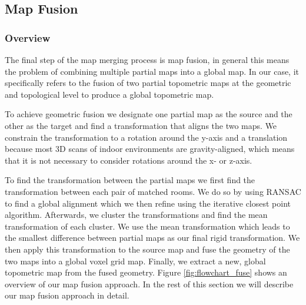 \subsection{Map Fusion}

\subsubsection{Overview}
The final step of the map merging process is map fusion, in general this means the problem of combining multiple partial maps into a global map. In our case, it specifically refers to the fusion of two partial topometric maps at the geometric and topological level to produce a global topometric map. 

To achieve geometric fusion we designate one partial map as the source and the other as the target and find a transformation that aligns the two maps. We constrain the transformation to a rotation around the y-axis and a translation because most 3D scans of indoor environments are gravity-aligned, which means that it is not necessary to consider rotations around the x- or z-axis. 

To find the transformation between the partial maps we first find the transformation between each pair of matched rooms. We do so by using RANSAC to find a global alignment which we then refine using the iterative closest point algorithm. Afterwards, we cluster the transformations and find the mean transformation of each cluster. We use the mean transformation which leads to the smallest difference between partial maps as our final rigid transformation. We then apply this transformation to the source map and fuse the geometry of the two maps into a global voxel grid map. Finally, we extract a new, global topometric map from the fused geometry. Figure \ref{fig:flowchart_fuse} shows an overview of our map fusion approach. In the rest of this section we will describe our map fusion approach in detail.


